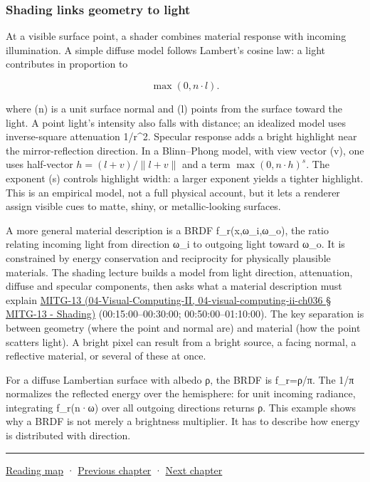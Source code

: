 \subsubsection{Shading links geometry to light}\label{shading-links-geometry-to-light}

At a visible surface point, a shader combines material response with incoming illumination. A simple diffuse model follows Lambert's cosine law: a light contributes in proportion to

\[
\max(0,n\cdot l).
\]

where (n) is a unit surface normal and (l) points from the surface toward the light. A point light's intensity also falls with distance; an idealized model uses inverse-square attenuation 1/r\^{}2. Specular response adds a bright highlight near the mirror-reflection direction. In a Blinn--Phong model, with view vector (v), one uses half-vector \(h=(l+v)/\|l+v\|\) and a term \(\max(0,n\cdot h)^s\). The exponent (s) controls highlight width: a larger exponent yields a tighter highlight. This is an empirical model, not a full physical account, but it lets a renderer assign visible cues to matte, shiny, or metallic-looking surfaces.

A more general material description is a BRDF f\_r(x,ω\_i,ω\_o), the ratio relating incoming light from direction ω\_i to outgoing light toward ω\_o. It is constrained by energy conservation and reciprocity for physically plausible materials. The shading lecture builds a model from light direction, attenuation, diffuse and specular components, then asks what a material description must explain \href{}{MITG-13 (04-Visual-Computing-II, 04-visual-computing-ii-ch036 § MITG-13 - Shading)} (00:15:00--00:30:00; 00:50:00--01:10:00). The key separation is between geometry (where the point and normal are) and material (how the point scatters light). A bright pixel can result from a bright source, a facing normal, a reflective material, or several of these at once.

For a diffuse Lambertian surface with albedo ρ, the BRDF is f\_r=ρ/π. The 1/π normalizes the reflected energy over the hemisphere: for unit incoming radiance, integrating f\_r(n·ω) over all outgoing directions returns ρ. This example shows why a BRDF is not merely a brightness multiplier. It has to describe how energy is distributed with direction.

\begin{center}\rule{0.5\linewidth}{0.5pt}\end{center}

\href{Chapter\%20Edition/02\%20-\%20Graphics\%20Vision\%20and\%20XR/00\%20-\%20Reading\%20Map}{Reading map} · \hyperref[03-visual-computing-i-ch005]{Previous chapter} · \hyperref[03-visual-computing-i-ch007]{Next chapter}
